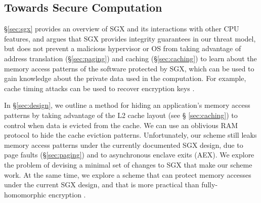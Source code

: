 \subsection{Towards Secure Computation}
\label{sec:approach}

\S \ref{sec:sgx} provides an overview of SGX and its interactions with other
CPU features, and argues that SGX provides integrity guarantees in our threat
model, but does not prevent a malicious hypervisor or OS from taking advantage
of address translation (\S \ref{sec:paging}) and caching (\S \ref{sec:caching})
to learn about the memory access patterns of the software protected by SGX,
which can be used to gain knowledge about the private data used in the
computation. For example, cache timing attacks can be used to recover
encryption keys \cite{bonneau2006cache} \cite{brumley2005remote}
\cite{kocher1996timing}.

In \S \ref{sec:design}, we outline a method for hiding an application's memory
access patterns by taking advantage of the L2 cache layout (see \S
\ref{sec:caching}) to control when data is evicted from the cache. We can use
an oblivious RAM protocol \cite{stefanov2012path} to hide the cache eviction
patterns. Unfortunately, our scheme still leaks memory access patterns under
the currently documented SGX design, due to page faults (\S \ref{sec:paging})
and to asynchronous enclave exits (AEX). We explore the problem of devising a
minimal set of changes to SGX that make our scheme work. At the same time, we
explore a scheme that can protect memory accesses under the current SGX design,
and that is more practical than fully-homomorphic encryption
\cite{gentry2009fhe} \cite{naehrig2011can}.
